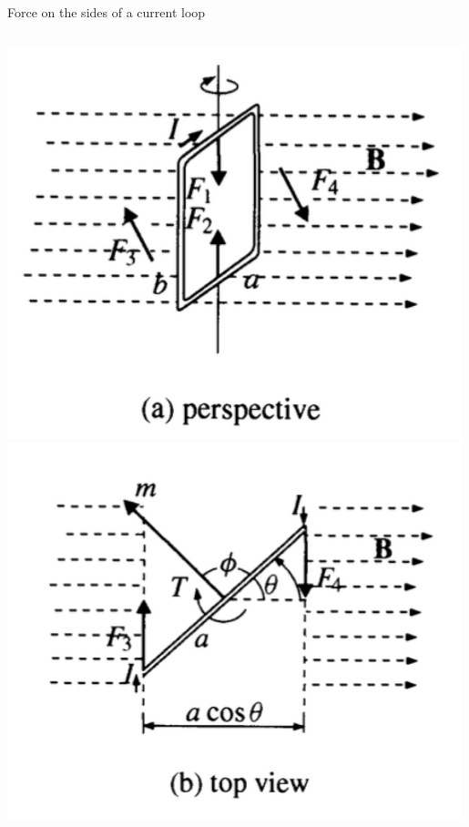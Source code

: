 \begin{frame}{Force on the sides of a current loop}

\begin{columns}
  \begin{column}{0.37\textwidth}
    \includegraphics[width=0.99\textwidth]{./images/schematics/magnetic_torque_current_loop_perspective.png}\\
    \vspace{0.3cm}
    \includegraphics[width=0.99\textwidth]{./images/schematics/magnetic_torque_current_loop_top_view.png}\\

\end{column}
\end{columns}
\end{frame}
